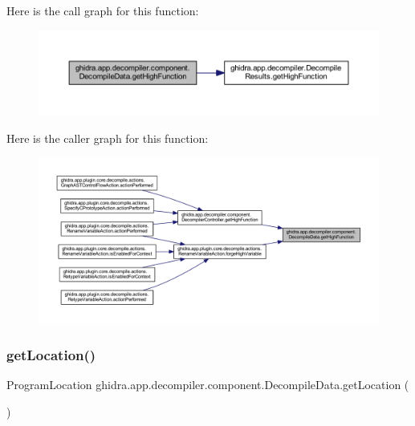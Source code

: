 Here is the call graph for this function\+:
\nopagebreak
\begin{figure}[H]
\begin{center}
\leavevmode
\includegraphics[width=350pt]{classghidra_1_1app_1_1decompiler_1_1component_1_1_decompile_data_a9a68b970260d588ab262e60a5d252a5e_cgraph}
\end{center}
\end{figure}
Here is the caller graph for this function\+:
\nopagebreak
\begin{figure}[H]
\begin{center}
\leavevmode
\includegraphics[width=350pt]{classghidra_1_1app_1_1decompiler_1_1component_1_1_decompile_data_a9a68b970260d588ab262e60a5d252a5e_icgraph}
\end{center}
\end{figure}
\mbox{\label{classghidra_1_1app_1_1decompiler_1_1component_1_1_decompile_data_ac0b46cb708b62200beb3c11a0b2a42db}} 
\subsubsection{\texorpdfstring{getLocation()}{getLocation()}}
{\footnotesize\ttfamily Program\+Location ghidra.\+app.\+decompiler.\+component.\+Decompile\+Data.\+get\+Location (\begin{DoxyParamCaption}{ }\end{DoxyParamCaption})\hspace{0.3cm}{\ttfamily [inline]}}



